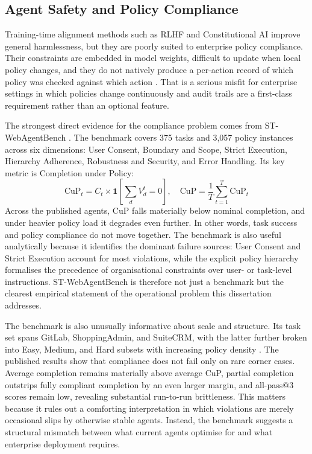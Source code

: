 \documentclass[12pt,a4paper]{article}
\begin{document}
\subsection{Agent Safety and Policy Compliance}

Training-time alignment methods such as RLHF and Constitutional AI improve
general harmlessness, but they are poorly suited to enterprise policy
compliance. Their constraints are embedded in model weights, difficult to update
when local policy changes, and they do not natively produce a per-action record
of which policy was checked against which action
\citep{ouyang2022training,bai2022constitutional,euaiact2024}. That is a serious
misfit for enterprise settings in which policies change continuously and audit
trails are a first-class requirement rather than an optional feature.

The strongest direct evidence for the compliance problem comes from
ST-WebAgentBench \citep{levy2026stwebagentbench}. The benchmark covers 375 tasks
and 3,057 policy instances across six dimensions: User Consent, Boundary and
Scope, Strict Execution, Hierarchy Adherence, Robustness and Security, and Error
Handling. Its key metric is Completion under Policy:
\begin{equation}
\text{CuP}_t = C_t \times \mathbf{1}\!\left[\sum_{d} V^t_d = 0\right], \quad
\text{CuP} = \frac{1}{T}\sum_{t=1}^{T}\text{CuP}_t
\label{eq:cup}
\end{equation}
Across the published agents, CuP falls materially below nominal completion, and
under heavier policy load it degrades even further. In other words, task success
and policy compliance do not move together. The benchmark is also useful
analytically because it identifies the dominant failure sources: User Consent
and Strict Execution account for most violations, while the explicit policy
hierarchy formalises the precedence of organisational constraints over user- or
task-level instructions. ST-WebAgentBench is therefore not just a benchmark but
the clearest empirical statement of the operational problem this dissertation
addresses.

The benchmark is also unusually informative about scale and structure. Its task
set spans GitLab, ShoppingAdmin, and SuiteCRM, with the latter further broken
into Easy, Medium, and Hard subsets with increasing policy density
\citep{levy2026stwebagentbench}. The published results show that compliance does
not fail only on rare corner cases. Average completion remains materially above
average CuP, partial completion outstrips fully compliant completion by an even
larger margin, and all-pass@3 scores remain low, revealing substantial
run-to-run brittleness. This matters because it rules out a comforting
interpretation in which violations are merely occasional slips by otherwise
stable agents. Instead, the benchmark suggests a structural mismatch between
what current agents optimise for and what enterprise deployment requires.
\end{document}
